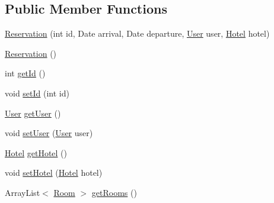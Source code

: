 \subsection*{Public Member Functions}
\begin{DoxyCompactItemize}
\item 
\mbox{\hyperlink{classbspq18__e4_1_1_gestion_hotelera_1_1server_1_1data_1_1_reservation_a7f8b69576ffa54f72edef9a3d4fd9d00}{Reservation}} (int id, Date arrival, Date departure, \mbox{\hyperlink{classbspq18__e4_1_1_gestion_hotelera_1_1server_1_1data_1_1_user}{User}} user, \mbox{\hyperlink{classbspq18__e4_1_1_gestion_hotelera_1_1server_1_1data_1_1_hotel}{Hotel}} hotel)
\item 
\mbox{\hyperlink{classbspq18__e4_1_1_gestion_hotelera_1_1server_1_1data_1_1_reservation_a8f6967bbdf8f439c1bd3f52450f259ab}{Reservation}} ()
\item 
int \mbox{\hyperlink{classbspq18__e4_1_1_gestion_hotelera_1_1server_1_1data_1_1_reservation_ab48c28a8d555d8738527b0b40cf5d238}{get\+Id}} ()
\item 
void \mbox{\hyperlink{classbspq18__e4_1_1_gestion_hotelera_1_1server_1_1data_1_1_reservation_a2c860ab7b795c4f8859fcb7f900bbded}{set\+Id}} (int id)
\item 
\mbox{\hyperlink{classbspq18__e4_1_1_gestion_hotelera_1_1server_1_1data_1_1_user}{User}} \mbox{\hyperlink{classbspq18__e4_1_1_gestion_hotelera_1_1server_1_1data_1_1_reservation_abaf4a31f0bc51e2c79acd8c72c225808}{get\+User}} ()
\item 
void \mbox{\hyperlink{classbspq18__e4_1_1_gestion_hotelera_1_1server_1_1data_1_1_reservation_a5803f7ee399f58b44cac0d19c454a2da}{set\+User}} (\mbox{\hyperlink{classbspq18__e4_1_1_gestion_hotelera_1_1server_1_1data_1_1_user}{User}} user)
\item 
\mbox{\hyperlink{classbspq18__e4_1_1_gestion_hotelera_1_1server_1_1data_1_1_hotel}{Hotel}} \mbox{\hyperlink{classbspq18__e4_1_1_gestion_hotelera_1_1server_1_1data_1_1_reservation_aa4ebf08dfc03cc532f8f8110b8f17176}{get\+Hotel}} ()
\item 
void \mbox{\hyperlink{classbspq18__e4_1_1_gestion_hotelera_1_1server_1_1data_1_1_reservation_a029c97e1142f8a4c78eab66e2532d4b8}{set\+Hotel}} (\mbox{\hyperlink{classbspq18__e4_1_1_gestion_hotelera_1_1server_1_1data_1_1_hotel}{Hotel}} hotel)
\item 
Array\+List$<$ \mbox{\hyperlink{classbspq18__e4_1_1_gestion_hotelera_1_1server_1_1data_1_1_room}{Room}} $>$ \mbox{\hyperlink{classbspq18__e4_1_1_gestion_hotelera_1_1server_1_1data_1_1_reservation_a86c7961203c77c499e5eaedc5da4f51b}{get\+Rooms}} ()

\end{DoxyCompactItemize}
